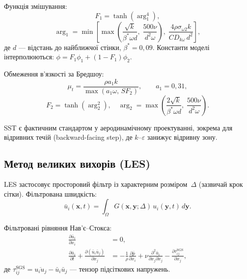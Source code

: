 \documentclass[14pt,a4paper,extarticle]{extarticle}
\begin{document}
Функція змішування:
\begin{equation}
  F_1 = \tanh \left( \arg_1^4 \right),
  \label{eq:f1}
\end{equation}
\begin{equation}
  \arg_1 = \min \left[
    \max \left( \frac{\sqrt{k}}{\beta^* \omega d},\; \frac{500\nu}{d^2 \omega} \right),\;
    \frac{4\rho\sigma_{\omega 2} k}{CD_{k\omega}\, d^2}
  \right],
  \label{eq:arg1}
\end{equation}
де $d$ --- відстань до найближчої стінки, $\beta^* = 0{,}09$. Константи моделі інтерполюються:
$\phi = F_1 \phi_1 + (1 - F_1)\phi_2$.

Обмеження в'язкості за Бредшоу:
\begin{equation}
  \mu_t = \frac{\rho a_1 k}{\max \left( a_1 \omega,\, S F_2 \right)},
  \qquad a_1 = 0{,}31,
  \label{eq:bradshaw}
\end{equation}
\begin{equation}
  F_2 = \tanh \left( \arg_2^2 \right),
  \quad
  \arg_2 = \max \left( \frac{2\sqrt{k}}{\beta^* \omega d},\; \frac{500 \nu}{d^2 \omega} \right).
  \label{eq:f2}
\end{equation}

SST є фактичним стандартом у аеродинамічному проектуванні, зокрема для
відривних течій (backward-facing step), де $k$--$\varepsilon$ занижує
відривну зону.

\subsection{Метод великих вихорів (LES)}

LES застосовує просторовий фільтр із характерним розміром~$\Delta$ (зазвичай
крок сітки). Фільтрована швидкість:
\begin{equation}
  \bar{u}_i(\mathbf{x}, t) = \int_{\Omega} G(\mathbf{x}, \mathbf{y}; \Delta)\, u_i(\mathbf{y}, t)\, d\mathbf{y}.
  \label{eq:filter}
\end{equation}

Фільтровані рівняння Нав'є--Стокса:
\begin{align}
  \frac{\partial \bar{u}_i}{\partial x_i} &= 0, \label{eq:les-cont}\\
  \frac{\partial \bar{u}_i}{\partial t} + \frac{\partial (\bar{u}_i \bar{u}_j)}{\partial x_j}
  &= -\frac{1}{\rho}\frac{\partial \bar{p}}{\partial x_i}
    + \nu \frac{\partial^2 \bar{u}_i}{\partial x_j \partial x_j}
    - \frac{\partial \tau_{ij}^{\mathrm{SGS}}}{\partial x_j}, \label{eq:les-momentum}
\end{align}
де $\tau_{ij}^{\mathrm{SGS}} = \overline{u_i u_j} - \bar{u}_i \bar{u}_j$ ---
тензор підсіткових напружень.
\end{document}
